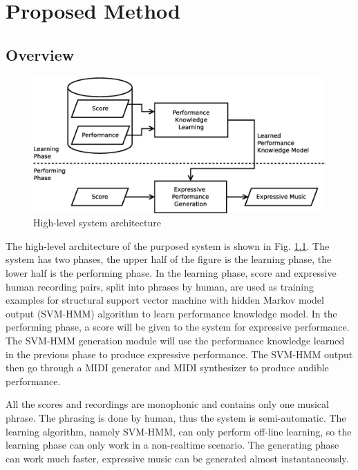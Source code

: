 \chapter{Proposed Method}
\label{chap:proposed}
\section{Overview}
      \begin{figure}[tp]
         \begin{center}
            \includegraphics[width=\textwidth]{fig/high_lev_arch}
         \end{center}
         \caption{High-level system architecture} 
         \label{fig:flow}
      \end{figure}
The high-level architecture of the purposed system is shown in Fig. \ref{fig:flow}. The system has two phases, the upper half of the figure is the learning phase, the lower half is the performing phase. In the learning phase, score and expressive human recording pairs, split into phrases by human, are used as training examples for structural support vector machine with hidden Markov model output (SVM-HMM) algorithm to learn performance knowledge model. In the performing phase, a score will be given to the system for expressive performance. The SVM-HMM generation module will use the performance knowledge learned in the previous phase to produce expressive performance. The SVM-HMM output then go through a MIDI generator and MIDI synthesizer to produce audible performance.

All the scores and recordings are monophonic and contains only one musical phrase. The phrasing is done by human, thus the system is semi-automatic. The learning algorithm, namely SVM-HMM, can only perform off-line learning, so the learning phase can only work in a non-realtime scenario. The generating phase can work much faster, expressive music can be generated almost instantaneously. 

